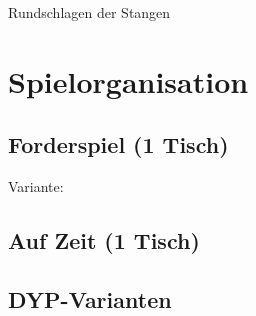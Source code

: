 Rundschlagen der Stangen

\section{Spielorganisation}

\subsection{Forderspiel (1 Tisch)}

Variante:

\subsection{Auf Zeit (1 Tisch)}

\subsection{DYP-Varianten}

